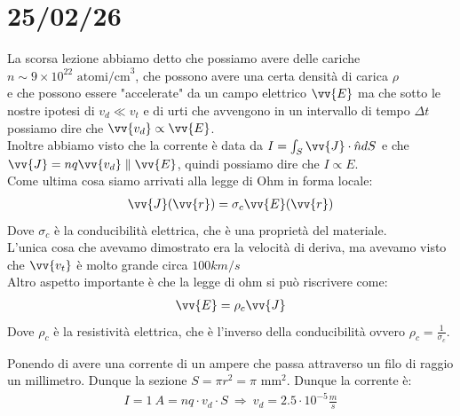 \documentclass[a4paper, oneside]{article}
\begin{document}
\section{25/02/26}
La scorsa lezione abbiamo detto che possiamo avere delle cariche $n \sim 9 \times 10^{22} \text{ atomi/cm}^3$, che possono avere una certa densità di carica $\rho$\\
e che possono essere "accelerate" da un campo elettrico $\vv{E}$ ma che sotto le nostre ipotesi di $v_d \ll v_t$ e di urti che avvengono in un intervallo di tempo $\Delta t$ possiamo dire che $\vv{v_d} \propto \vv{E}$.\\
Inoltre abbiamo visto che la corrente è data da $I = \int_S \vv{J} \cdot \hat{n} dS$ e che $\vv{J} = n q \vv{v_d} \parallel \vv{E}$, quindi possiamo dire che $I \propto E$.\\
Come ultima cosa siamo arrivati alla legge di Ohm in forma locale:
\begin{gather*}
    \vv{J}(\vv{r}) = \sigma_c \vv{E}(\vv{r})
\end{gather*}
Dove $\sigma_c$ è la conducibilità elettrica, che è una proprietà del materiale.\\
L'unica cosa che avevamo dimostrato era la velocità di deriva, ma avevamo visto che $\vv{v_t}$ è molto grande circa $100 km/s$\\
Altro aspetto importante è che la legge di ohm si può riscrivere come:
\begin{gather*}
    \vv{E} = \rho_c \vv{J}
\end{gather*}
Dove $\rho_c$ è la resistività elettrica, che è l'inverso della conducibilità ovvero $\rho_c = \frac{1}{\sigma_c}$.\\
\begin{example}
    Ponendo di avere una corrente di un ampere che passa attraverso un filo di raggio
    un millimetro. Dunque la sezione $S = \pi r^{2} = \pi$ mm$^{2}$. Dunque la corrente è:
    \begin{gather*}
        I = 1 \ A = n q \cdot v_d \cdot S  \ \Longrightarrow \ v_d = 2.5 \cdot 10^{-5} \frac{m}{s}
    \end{gather*} 
\end{example}
\end{document}
